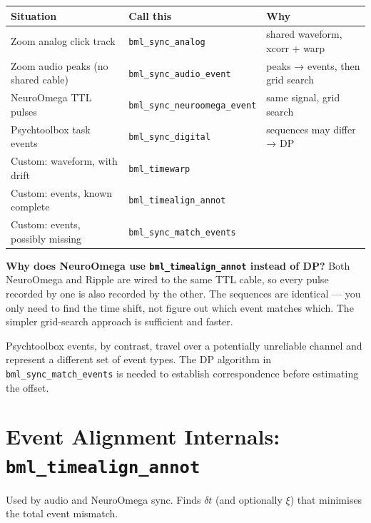 \documentclass[11pt, a4paper]{article}
\begin{document}
\begin{center}
\renewcommand{\arraystretch}{1.4}
\begin{tabular}{lll}
\toprule
\textbf{Situation} & \textbf{Call this} & \textbf{Why} \\
\midrule
Zoom analog click track & \texttt{bml\_sync\_analog} & shared waveform, xcorr + warp \\
Zoom audio peaks (no shared cable) & \texttt{bml\_sync\_audio\_event} & peaks → events, then grid search \\
NeuroOmega TTL pulses & \texttt{bml\_sync\_neuroomega\_event} & same signal, grid search \\
Psychtoolbox task events & \texttt{bml\_sync\_digital} & sequences may differ → DP \\
Custom: waveform, with drift & \texttt{bml\_timewarp} & \\
Custom: events, known complete & \texttt{bml\_timealign\_annot} & \\
Custom: events, possibly missing & \texttt{bml\_sync\_match\_events} & \\
\bottomrule
\end{tabular}
\end{center}

\begin{notebox}
\textbf{Why does NeuroOmega use \texttt{bml\_timealign\_annot} instead of DP?}
Both NeuroOmega and Ripple are wired to the same TTL cable, so every pulse recorded by one is also recorded by the other. The sequences are identical --- you only need to find the time shift, not figure out which event matches which. The simpler grid-search approach is sufficient and faster.

Psychtoolbox events, by contrast, travel over a potentially unreliable channel and represent a different set of event types. The DP algorithm in \texttt{bml\_sync\_match\_events} is needed to establish correspondence before estimating the offset.
\end{notebox}

\section{Event Alignment Internals: \texttt{bml\_timealign\_annot}}
\label{sec:timealign_annot}

Used by audio and NeuroOmega sync. Finds $\delta t$ (and optionally $\xi$) that minimises the total event mismatch.
\end{document}
